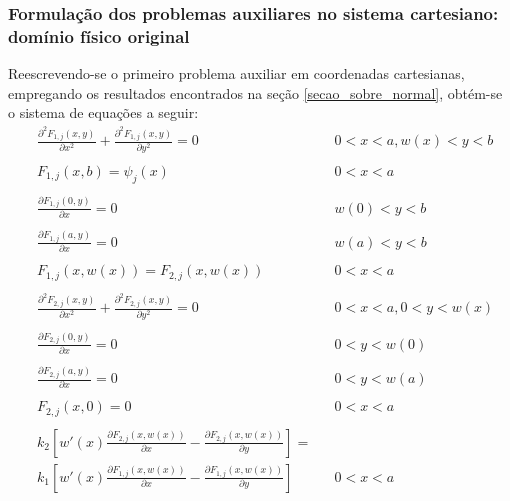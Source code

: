 \subsubsection{Formulação dos problemas auxiliares no sistema cartesiano: domínio físico original}

Reescrevendo-se o primeiro problema auxiliar em coordenadas cartesianas, empregando os resultados encontrados na seção \ref{secao_sobre_normal}, obtém-se o sistema de equações a seguir:
\begin{subequations}
	\begin{alignat}{2}
	& \frac{\partial^2 F_{1,j}(x, y)}{\partial x^2} + \frac{\partial^2 F_{1,j}(x, y)}{\partial y^2} = 0  && 0 < x < a, w(x) < y < b \label{funcao_F_harm_T1_cart} \\ \nonumber \\
	& F_{1,j}(x, b) = \psi_j(x) && 0 < x < a  \label{funcao_F_cc_T1_2_cart} \\ \nonumber \\
	& \frac{\partial F_{1,j}(0, y)}{\partial x} = 0 && w(0) < y < b \label{funcao_F_cc_T1_1a_cart} \\ \nonumber \\
	& \frac{\partial F_{1,j}(a, y)}{\partial x} = 0 && w(a) < y < b \label{funcao_F_cc_T1_1b_cart} \\ \nonumber \\
	& F_{1,j}(x, w(x)) = F_{2, j}(x, w(x)) && 0 < x < a \label{funcao_F_cc_grad_T1_cart} \\ \nonumber \\
	& \frac{\partial^2 F_{2,j}(x, y)}{\partial x^2} + \frac{\partial^2 F_{2,j}(x, y)}{\partial y^2} = 0 &&  0 < x < a, 0 < y < w(x) \label{funcao_F_harm_T2_cart} \\ \nonumber \\
	& \frac{\partial F_{2,j}(0, y)}{\partial x} = 0 && 0 < y < w(0) \label{funcao_F_cc_T1_3a_cart} \\ \nonumber \\
	& \frac{\partial F_{2,j}(a, y)}{\partial x} = 0 && 0 < y < w(a) \label{funcao_F_cc_T1_3b_cart} \\ \nonumber \\
	& F_{2,j}(x, 0) = 0 && 0 < x < a \label{funcao_F_cc_T1_4_cart} \\ \nonumber \\
	& k_2\left[w'(x)\frac{\partial F_{2,j}(x, w(x))}{\partial x} - \frac{\partial F_{2,j}(x, w(x))}{\partial y}\right] = \nonumber \\
	& k_1\left[w'(x)\frac{\partial F_{1,j}(x, w(x))}{\partial x} - \frac{\partial F_{1,j}(x, w(x))}{\partial y}\right] && 0 < x < a \label{funcao_F_cc_T1_5_cart}
	\end{alignat}
\end{subequations}

